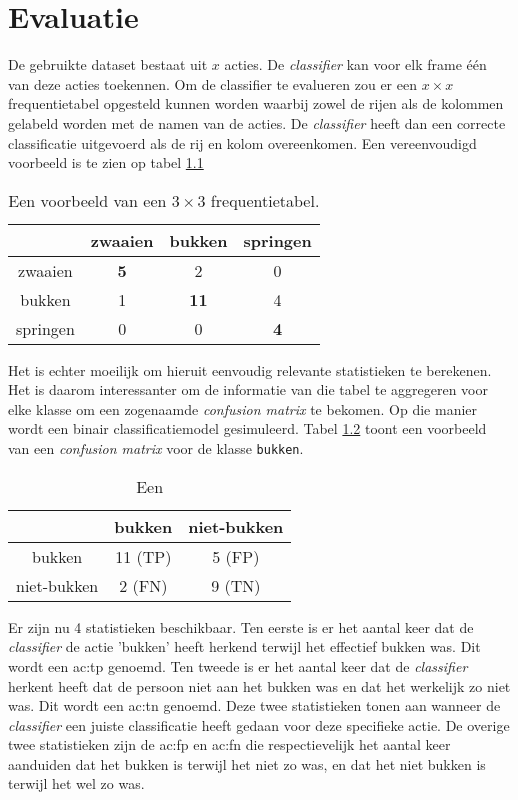 \chapter{Evaluatie}
\label{ch:evaluatie}
De gebruikte dataset bestaat uit $x$ acties. De \textit{classifier} kan voor elk frame één van deze acties toekennen. Om de classifier te evalueren zou er een $x \times x$ frequentietabel opgesteld kunnen worden waarbij zowel de rijen als de kolommen gelabeld worden met de namen van de acties. De \textit{classifier} heeft dan een correcte classificatie uitgevoerd als de rij en kolom overeenkomen. Een vereenvoudigd voorbeeld is te zien op tabel \ref{table:example_evaluation}
\begin{table}[ht]
	\centering
	\begin{tabular}{| c | ccc |}
		\hline
				& zwaaien & bukken & springen \\
				\hline
		zwaaien & \textbf{5} & 2 & 0 \\
		bukken & 1 & \textbf{11} & 4 \\
		springen & 0 & 0 & \textbf{4} \\
		\hline
		
	\end{tabular}
	\caption{Een voorbeeld van een $3 \times 3$ frequentietabel.}
	\label{table:example_evaluation}
\end{table}

Het is echter moeilijk om hieruit eenvoudig relevante statistieken te berekenen. Het is daarom interessanter om de informatie van die tabel te aggregeren voor elke klasse om een zogenaamde \textit{confusion matrix} te bekomen. Op die manier wordt een binair classificatiemodel gesimuleerd. Tabel \ref{table:example_evaluation_aggregate} toont een voorbeeld van een \textit{confusion matrix} voor de klasse \texttt{bukken}. 
\begin{table}[ht]
	\centering
	\begin{tabular}{| c | cc |}
		\hline
		& bukken & niet-bukken \\
		\hline
		bukken & 11 (TP) & 5 (FP) \\
		niet-bukken & 2 (FN) & 9 (TN)\\
		\hline
	\end{tabular}
	\caption{Een}
	\label{table:example_evaluation_aggregate}
\end{table}

Er zijn nu 4 statistieken beschikbaar. Ten eerste is er het aantal keer dat de \textit{classifier} de actie 'bukken' heeft herkend terwijl het effectief bukken was. Dit wordt een \gls{ac:tp} genoemd. Ten tweede is er het aantal keer dat de \textit{classifier} herkent heeft dat de persoon niet aan het bukken was en dat het werkelijk zo niet was. Dit wordt een \gls{ac:tn} genoemd. Deze twee statistieken tonen aan wanneer de \textit{classifier} een juiste classificatie heeft gedaan voor deze specifieke actie. De overige twee statistieken zijn de \gls{ac:fp} en \gls{ac:fn} die respectievelijk het aantal keer aanduiden dat het bukken is terwijl het niet zo was, en dat het niet bukken is terwijl het wel zo was. 

